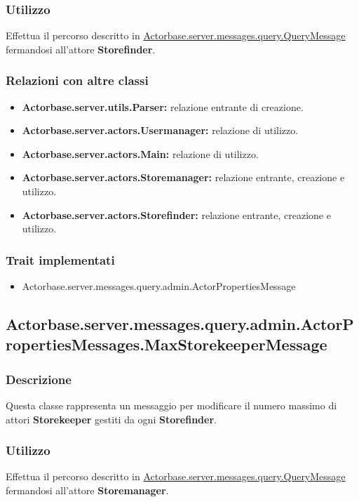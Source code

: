 \documentclass[a4paper]{article}
\begin{document}
			\subsubsection{Utilizzo}
				Effettua il percorso descritto in \hyperref[QueryMessage]{Actorbase.server.messages.query.QueryMessage} fermandosi all'attore 
				\textbf{Storefinder}.
				
			\subsubsection{Relazioni con altre classi}
				\begin{itemize}
					\item \textbf{Actorbase.server.utils.Parser:} relazione entrante di creazione.
					\item \textbf{Actorbase.server.actors.Usermanager:} relazione di utilizzo.
					\item \textbf{Actorbase.server.actors.Main:} relazione di utilizzo.
					\item \textbf{Actorbase.server.actors.Storemanager:} relazione entrante, creazione e utilizzo.
					\item \textbf{Actorbase.server.actors.Storefinder:} relazione entrante, creazione e utilizzo.
				\end{itemize}
			\subsubsection{Trait implementati}
				\begin{itemize}
					\item Actorbase.server.messages.query.admin.ActorPropertiesMessage
				\end{itemize}
		
		\subsection{Actorbase.server.messages.query.admin.ActorPropertiesMessages.MaxStorekeeperMessage}
			\subsubsection{Descrizione}
				Questa classe rappresenta un messaggio per modificare il numero massimo di attori \textbf{Storekeeper} gestiti da ogni \textbf{Storefinder}.
				
			\subsubsection{Utilizzo}
				Effettua il percorso descritto in \hyperref[QueryMessage]{Actorbase.server.messages.query.QueryMessage} fermandosi all'attore 
				\textbf{Storemanager}.
				
\end{document}
